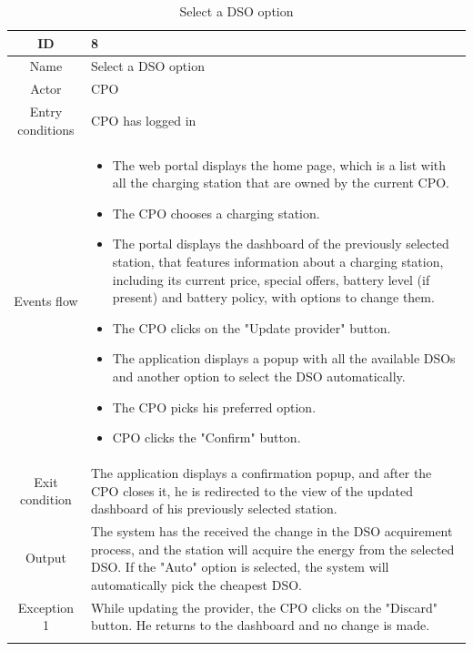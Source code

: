 \begin{longtable}{|c| p{10cm}|}
    \hline ID        & 8\\
    \hline
    Name     & Select a DSO option \\
    \hline
    Actor            & CPO\\
    \hline
    Entry conditions & CPO has logged in \\
    \hline
    Events flow      & \begin{itemize}[nosep,after=\strut]
        \item The web portal displays the home page, which is a list with all the charging station that are owned by the current CPO.
        \item The CPO chooses a charging station.
        \item The portal displays the dashboard of the previously selected station, that features information about a charging station, including its current price, special offers, battery level (if present) and battery policy, with options to change them.
        \item The CPO clicks on the "Update provider" button.
        \item The application displays a popup with all the available DSOs and another option to select the DSO automatically.
        \item The CPO picks his preferred option.
        \item CPO clicks the "Confirm" button.
    \end{itemize}\\
    \hline
    Exit condition   & The application displays a confirmation popup, and after the CPO closes it, he is redirected to the view of the updated dashboard of his previously selected station.\\
    \hline
    Output           & The system has the received the change in the DSO acquirement process, and the station will acquire the energy from the selected DSO. If the "Auto" option is selected, the system will automatically pick the cheapest DSO.
    \\
    \hline
    \hline
    Exception 1      &  While updating the provider, the CPO clicks on the "Discard" button. He returns to the dashboard and no change is made. \\
    \hline
    \caption{Select a DSO option}\\
\end{longtable}

